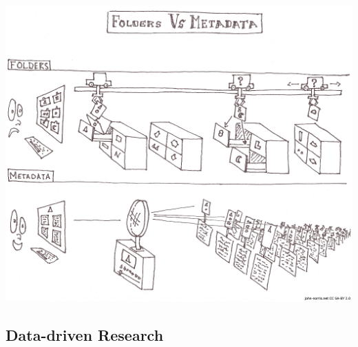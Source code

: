 \documentclass[compress,11pt,xcolor=svgnames,aspectratio=169]{beamer}
\begin{document}
\begin{frame}[fragile]{}

\begin{center}
\includegraphics[scale=0.7]{fig/FoldersVsMeta}
\end{center}

\end{frame}

\subsection{Data-driven Research}
\end{document}
